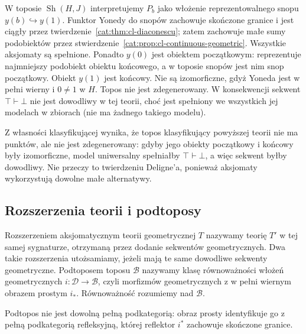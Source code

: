 \begin{przyklad}
W toposie $\operatorname{Sh}(H,J)$ interpretujemy $P_b$ jako włożenie reprezentowalnego snopu $y(b)\hookrightarrow y(1)$. Funktor Yonedy do snopów zachowuje skończone granice i jest ciągły przez twierdzenie~\ref{cat:thm:cl-diaconescu}; zatem zachowuje małe sumy podobiektów przez stwierdzenie~\ref{cat:prop:cl-continuous-geometric}. Wszystkie aksjomaty są spełnione. Ponadto $y(0)$ jest obiektem początkowym: reprezentuje najmniejszy podobiekt obiektu końcowego, a w toposie snopów jest nim snop początkowy. Obiekt $y(1)$ jest końcowy. Nie są izomorficzne, gdyż Yoneda jest w pełni wierny i $0\neq1$ w $H$. Topos nie jest zdegenerowany. W konsekwencji sekwent $\top\vdash\bot$ nie jest dowodliwy w tej teorii, choć jest spełniony we wszystkich jej modelach w zbiorach (nie ma żadnego takiego modelu).
\end{przyklad}

Z własności klasyfikującej wynika, że topos klasyfikujący powyższej teorii nie ma punktów, ale nie jest zdegenerowany: gdyby jego obiekty początkowy i końcowy były izomorficzne, model uniwersalny spełniałby $\top\vdash\bot$, a więc sekwent byłby dowodliwy. Nie przeczy to twierdzeniu Deligne'a, ponieważ aksjomaty wykorzystują dowolne małe alternatywy.

\subsection{Rozszerzenia teorii i podtoposy}

\begin{definicja}\label{cat:def:cl-quotient-subtopos}
Rozszerzeniem aksjomatycznym teorii geometrycznej $T$ nazywamy teorię $T'$ w tej samej sygnaturze, otrzymaną przez dodanie sekwentów geometrycznych. Dwa takie rozszerzenia utożsamiamy, jeżeli mają te same dowodliwe sekwenty geometryczne. Podtoposem toposu $\mathcal B$ nazywamy klasę równoważności włożeń geometrycznych $i:\mathcal D\to\mathcal B$, czyli morfizmów geometrycznych z w pełni wiernym obrazem prostym $i_*$. Równoważność rozumiemy nad $\mathcal B$.
\end{definicja}

Podtopos nie jest dowolną pełną podkategorią: obraz prosty identyfikuje go z pełną podkategorią refleksyjną, której reflektor $i^*$ zachowuje skończone granice.

